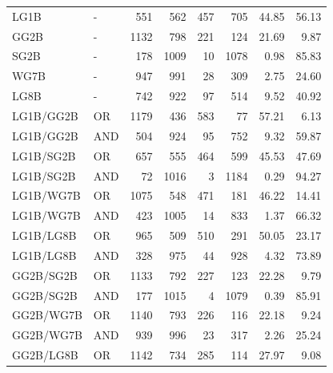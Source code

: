\documentclass{article}
\begin{document}
{\begin{longtable}{llrrrrrr}
LG1B                     & -       &  551 &  562 &  457 &  705 & 44.85             & 56.13             \\
 GG2B                     & -       & 1132 &  798 &  221 &  124 & 21.69             & 9.87              \\
 SG2B                     & -       &  178 & 1009 &   10 & 1078 & 0.98              & 85.83             \\
 WG7B                     & -       &  947 &  991 &   28 &  309 & 2.75              & 24.60             \\
 LG8B                     & -       &  742 &  922 &   97 &  514 & 9.52              & 40.92             \\
 LG1B/GG2B                & OR      & 1179 &  436 &  583 &   77 & 57.21             & 6.13              \\
 LG1B/GG2B                & AND     &  504 &  924 &   95 &  752 & 9.32              & 59.87             \\
 LG1B/SG2B                & OR      &  657 &  555 &  464 &  599 & 45.53             & 47.69             \\
 LG1B/SG2B                & AND     &   72 & 1016 &    3 & 1184 & 0.29              & 94.27             \\
 LG1B/WG7B                & OR      & 1075 &  548 &  471 &  181 & 46.22             & 14.41             \\
 LG1B/WG7B                & AND     &  423 & 1005 &   14 &  833 & 1.37              & 66.32             \\
 LG1B/LG8B                & OR      &  965 &  509 &  510 &  291 & 50.05             & 23.17             \\
 LG1B/LG8B                & AND     &  328 &  975 &   44 &  928 & 4.32              & 73.89             \\
 GG2B/SG2B                & OR      & 1133 &  792 &  227 &  123 & 22.28             & 9.79              \\
 GG2B/SG2B                & AND     &  177 & 1015 &    4 & 1079 & 0.39              & 85.91             \\
 GG2B/WG7B                & OR      & 1140 &  793 &  226 &  116 & 22.18             & 9.24              \\
 GG2B/WG7B                & AND     &  939 &  996 &   23 &  317 & 2.26              & 25.24             \\
 GG2B/LG8B                & OR      & 1142 &  734 &  285 &  114 & 27.97             & 9.08              \\

\end{longtable}}
\end{document}
